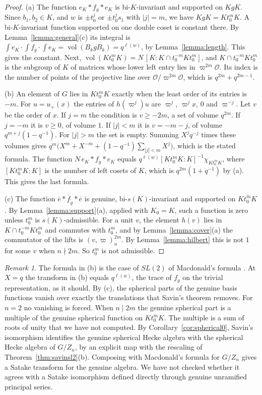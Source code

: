 \documentclass[12pt,letterpaper]{amsart}
\numberwithin{equation}{section}
\theoremstyle{definition}
\theoremstyle{remark}
\newtheorem{remark}[theorem]{Remark}
\DeclareMathOperator{\vol}{vol}
\newcommand{\cO}{\mathcal{O}}
\newcommand{\fbar}{\overline{f}}
\begin{document}
\begin{proof}
(a) The function $e_K*f_g*e_K$ is bi-$K$-invariant and supported on
$KgK$. Since $b_1,b_2\in K$, and $w$ is $\pm t_0^j$ or $\pm t_0^js_1$
with $|j|=m$, we have $KgK=Kt_0^mK$. A bi-$K$-invariant function
supported on one double coset is constant there. By
Lemma~\ref{lemma:general}(c) its integral is
$\int e_K\cdot\int f_g\cdot\int e_K=\vol(B_kgB_k)=q^{\ell(w)}$, by
Lemma~\ref{lemma:length}. This gives the constant. Next,
$\vol(Kt_0^mK)=N\,[K:K\cap t_0^{-m}Kt_0^m]$, and $K\cap t_0^{-m}Kt_0^m$
is the subgroup of $K$ of matrices whose lower left entry lies in
$\varpi^{2m}\cO$. Its index is the number of points of the projective
line over $\cO/\varpi^{2m}\cO$, which is $q^{2m}+q^{2m-1}$.

(b) An element of $G$ lies in $Kt_0^mK$ exactly when the least order of
its entries is $-m$. For $u=u_+(x)$ the entries of $h(\varpi^j)u$ are
$\varpi^j$, $\varpi^jx$, $0$ and $\varpi^{-j}$. Let $v$ be the order of
$x$. If $j=m$ the condition is $v\geq -2m$, a set of volume $q^{2m}$. If
$j=-m$ it is $v\geq 0$, of volume $1$. If $|j|<m$ it is $v=-m-j$, of
volume $q^{m+j}(1-q^{-1})$. For $|j|>m$ the set is empty. Summing
$X^jq^{-j}$ times these volumes gives
$q^m\bigl(X^m+X^{-m}+(1-q^{-1})\sum_{|j|<m}X^j\bigr)$, which is the
stated formula. The function $N\,e_K*f_g*e_K$ equals
$q^{\ell(w)}[Kt_0^mK:K]^{-1}\chi_{Kt_0^mK}$, where $[Kt_0^mK:K]$ is the
number of left cosets of $K$, which is $q^{2m}(1+q^{-1})$ by (a). This
gives the last formula.

(c) The function $\overline e*\fbar_{\tilde g}*\overline e$ is genuine,
bi-$s(K)$-invariant and supported on $\overline{Kt_0^mK}$. By
Lemma~\ref{lemma:support}(a), applied with $K_0=K$, such a function is
zero unless $t_0^m$ is $s(K)$-admissible. For a unit $v$, the element
$h(v)$ lies in $K\cap t_0^{-m}Kt_0^m$ and commutes with $t_0^m$, and by
Lemma~\ref{lemma:cover}(a) the commutator of the lifts is
$(v,\varpi)_n^{2m}$. By Lemma~\ref{lemma:hilbert} this is not $1$ for
some $v$ when $n\nmid 2m$. So $t_0^m$ is not admissible.
\end{proof}

\begin{remark}
\label{rem:spherical}
The formula in (b) is the case of $SL(2)$ of Macdonald's formula
\cite{Ma71}. At $X=q$ the transform in (b) equals $q^{\ell(w)}$, the
trace of $f_g$ on the trivial representation, as it should. By (c), the
spherical parts of the genuine basis functions vanish over exactly the
translations that Savin's theorem removes. For $n=2$ no vanishing is
forced. When $n\mid 2m$ the genuine spherical part is a multiple of the
genuine spherical function on $Kt_0^mK$. The multiple is a sum of roots
of unity that we have not computed. By Corollary~\ref{cor:spherical0}, Savin's isomorphism identifies the
genuine spherical Hecke algebra with the spherical Hecke algebra of
$G/Z_n$, by an explicit map with the rescaling of
Theorem~\ref{thm:savinsl2}(b). Composing with Macdonald's formula for
$G/Z_n$ gives a Satake transform for the genuine algebra. We have not
checked whether it agrees with a Satake isomorphism defined directly
through genuine unramified principal series.
\end{remark}
\end{document}
